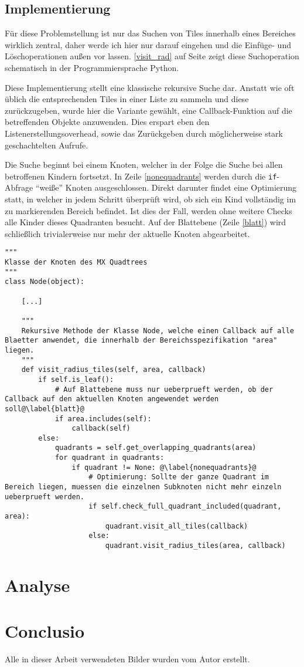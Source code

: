 \documentclass[%
			fontsize=12pt,%
			paper=a4,%
			DIV11,
			liststotoc,
			bibtotoc,
			draft=false,%
			titlepage
			]{scrartcl}
\newcommand{\inlinecode}[1]{\mbox{\texttt{#1}}}
\begin{document}
\subsection{Implementierung}

Für diese Problemstellung ist nur das Suchen von Tiles innerhalb eines Bereiches wirklich zentral, daher werde ich hier nur darauf eingehen und die Einfüge- und Löschoperationen außen vor lassen.
\lstlistingname{} \ref{visit_rad} auf Seite \pageref{visit_rad} zeigt diese Suchoperation schematisch in der Programmiersprache Python.

Diese Implementierung stellt eine klassische rekursive Suche dar. 
Anstatt wie oft üblich die entsprechenden Tiles in einer Liste zu sammeln und diese zurückzugeben, wurde hier die Variante gewählt, eine Callback-Funktion auf die betreffenden Objekte anzuwenden. Dies erspart eben den Listenerstellungsoverhead, sowie das Zurückgeben durch möglicherweise stark geschachtelten Aufrufe.

Die Suche beginnt bei einem Knoten, welcher in der Folge die Suche bei allen betroffenen Kindern fortsetzt.
In Zeile \ref{nonequadrants} werden durch die \inlinecode{if}-Abfrage "`weiße"' Knoten ausgeschlossen.
Direkt darunter findet eine Optimierung statt, in welcher in jedem Schritt überprüft wird, ob sich ein Kind vollständig im zu markierenden Bereich befindet.
Ist dies der Fall, werden ohne weitere Checks alle Kinder dieses Quadranten besucht.
Auf der Blattebene (Zeile \ref{blatt}) wird schließlich trivialerweise nur mehr der aktuelle Knoten abgearbeitet.

\begin{lstlisting}[float=h,caption=Python-ähnlicher Pseudocode zur Lösung des Markierungsproblems,label=visit_rad]
"""
Klasse der Knoten des MX Quadtrees
"""
class Node(object):

	[...]

	"""
	Rekursive Methode der Klasse Node, welche einen Callback auf alle Blaetter anwendet, die innerhalb der Bereichsspezifikation "area" liegen.
	"""
	def visit_radius_tiles(self, area, callback)
		if self.is_leaf():
			# Auf Blattebene muss nur ueberprueft werden, ob der Callback auf den aktuellen Knoten angewendet werden soll@\label{blatt}@
			if area.includes(self):
				callback(self)
		else:
			quadrants = self.get_overlapping_quadrants(area)
			for quadrant in quadrants:
				if quadrant != None: @\label{nonequadrants}@
					# Optimierung: Sollte der ganze Quadrant im Bereich liegen, muessen die einzelnen Subknoten nicht mehr einzeln ueberprueft werden.
					if self.check_full_quadrant_included(quadrant, area):
						quadrant.visit_all_tiles(callback)
					else:
						quadrant.visit_radius_tiles(area, callback)
\end{lstlisting}

\section{Analyse}

\section{Conclusio}

\newpage

\listoffigures

Alle in dieser Arbeit verwendeten Bilder wurden vom Autor erstellt.

\lstlistoflistings

\newpage

\nocite{*} %

\end{document}
